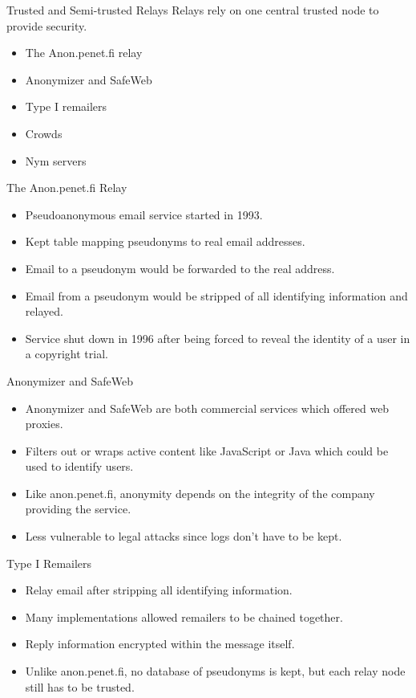 \documentclass[default,pdf,colorBG,slideColor]{prosper}
\begin{document}
\begin{slide}{Trusted and Semi-trusted Relays}
Relays rely on one central trusted node to provide security.
\begin{itemize}
\item The Anon.penet.fi relay
\item Anonymizer and SafeWeb
\item Type I remailers
\item Crowds
\item Nym servers
\end{itemize}
\end{slide}

\begin{slide}{The Anon.penet.fi Relay}
\begin{itemize}
\item Pseudoanonymous email service started in 1993.
\item Kept table mapping pseudonyms to real email addresses.
\item Email to a pseudonym would be forwarded to the real address.
\item Email from a pseudonym would be stripped of all identifying information and relayed.
\item Service shut down in 1996 after being forced to reveal the identity of a user in a copyright trial.
\end{itemize}
\end{slide}

\begin{slide}{Anonymizer and SafeWeb}
\begin{itemize}
\item Anonymizer and SafeWeb are both commercial services which offered web proxies.
\item Filters out or wraps active content like JavaScript or Java which could be used to identify users.
\item Like anon.penet.fi, anonymity depends on the integrity of the company providing the service.
\item Less vulnerable to legal attacks since logs don't have to be kept.
\end{itemize}
\end{slide}

\begin{slide}{Type I Remailers}
\begin{itemize}
\item Relay email after stripping all identifying information.
\item Many implementations allowed remailers to be chained together.
\item Reply information encrypted within the message itself.
\item Unlike anon.penet.fi, no database of pseudonyms is kept, but each relay node still has to be trusted.
\end{itemize}
\end{slide}
\end{document}
